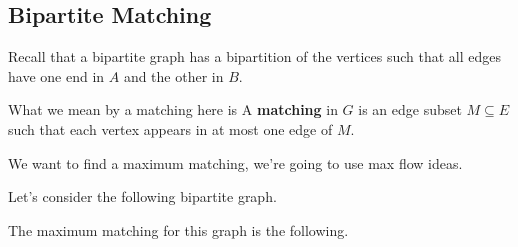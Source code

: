 \documentclass[12pt]{article}
\begin{document}
  \subsection{Bipartite Matching}

  Recall that a bipartite graph has a bipartition of the vertices such that all
  edges have one end in $A$ and the other in $B$.

  What we mean by a matching here is 
  \Definition {}
  {
    A {\bf matching} in $G$ is an edge subset $M \subseteq E$ such that each
    vertex appears in at most one edge of $M$.
  }

  We want to find a maximum matching, we're going to use max flow ideas.

  Let's consider the following bipartite graph.

  \begin{center}
  \end{center}

  The maximum matching for this graph is the following.
\end{document}
